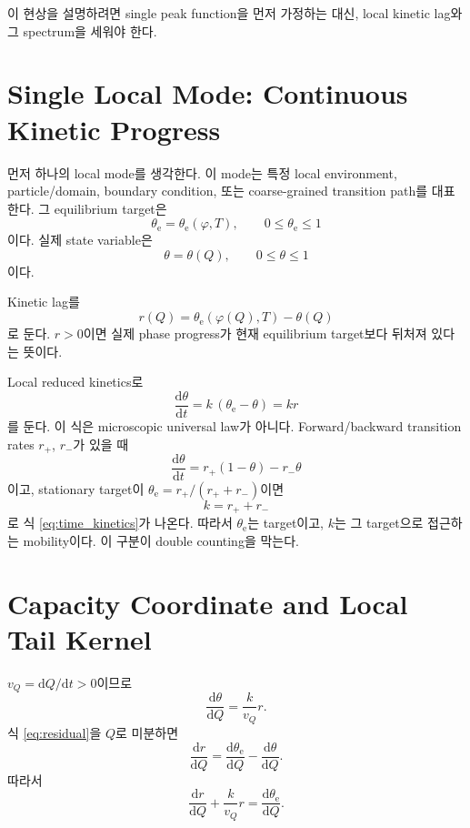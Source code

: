 \documentclass[11pt,a4paper]{article}
\newcommand{\dd}{\mathrm{d}}
\begin{document}
이 현상을 설명하려면 single peak function을 먼저 가정하는 대신, local kinetic lag와 그 spectrum을 세워야 한다.

\section{Single Local Mode: Continuous Kinetic Progress}

먼저 하나의 local mode를 생각한다. 이 mode는 특정 local environment, particle/domain, boundary condition, 또는 coarse-grained transition path를 대표한다. 그 equilibrium target은
\begin{equation}
\theta_{\mathrm e}=\theta_{\mathrm e}(\varphi,T),
\qquad
0\le \theta_{\mathrm e}\le1
\label{eq:thetae}
\end{equation}
이다. 실제 state variable은
\begin{equation}
\theta=\theta(Q),
\qquad
0\le\theta\le1
\label{eq:theta}
\end{equation}
이다.

Kinetic lag를
\begin{equation}
r(Q)=\theta_{\mathrm e}(\varphi(Q),T)-\theta(Q)
\label{eq:residual}
\end{equation}
로 둔다. \(r>0\)이면 실제 phase progress가 현재 equilibrium target보다 뒤처져 있다는 뜻이다.

Local reduced kinetics로
\begin{equation}
\frac{\dd\theta}{\dd t}=k\,(\theta_{\mathrm e}-\theta)=k r
\label{eq:time_kinetics}
\end{equation}
를 둔다. 이 식은 microscopic universal law가 아니다. Forward/backward transition rates \(r_+\), \(r_-\)가 있을 때
\begin{equation}
\frac{\dd\theta}{\dd t}=r_+(1-\theta)-r_-\theta
\end{equation}
이고, stationary target이 \(\theta_{\mathrm e}=r_+/(r_++r_-)\)이면
\begin{equation}
k=r_++r_-
\end{equation}
로 식 \eqref{eq:time_kinetics}가 나온다. 따라서 \(\theta_{\mathrm e}\)는 target이고, \(k\)는 그 target으로 접근하는 mobility이다. 이 구분이 double counting을 막는다.

\section{Capacity Coordinate and Local Tail Kernel}

\(v_Q=\dd Q/\dd t>0\)이므로
\begin{equation}
\frac{\dd\theta}{\dd Q}
=
\frac{k}{v_Q}r .
\label{eq:dtheta_dQ}
\end{equation}
식 \eqref{eq:residual}을 \(Q\)로 미분하면
\begin{equation}
\frac{\dd r}{\dd Q}
=
\frac{\dd\theta_{\mathrm e}}{\dd Q}
-
\frac{\dd\theta}{\dd Q}.
\end{equation}
따라서
\begin{equation}
\boxed{
\frac{\dd r}{\dd Q}
+
\frac{k}{v_Q}r
=
\frac{\dd\theta_{\mathrm e}}{\dd Q}.
}
\label{eq:residual_ode}
\end{equation}
\end{document}
